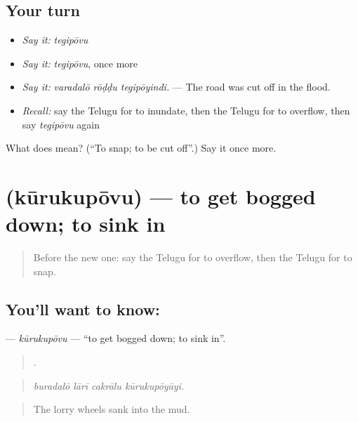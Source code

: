 \subsection*{Your turn}
\begin{itemize}
\raggedright
  \item \emph{Say it:} \emph{tegipōvu}
  \item \emph{Say it:} \emph{tegipōvu}, once more
  \item \emph{Say it:} \emph{varadalō rōḍḍu tegipōyindi.} — The road was cut off in the flood.
  \item \emph{Recall:} say the Telugu for to inundate, then the Telugu for to overflow, then say \emph{tegipōvu} again
\end{itemize}

\begin{tcolorbox}[breakable,colback=teal!4,colframe=teal!35!black,title={Before you move on}]
What does  mean? (\textquotedblleft{}To snap; to be cut off\textquotedblright{}.) Say it once more.
\end{tcolorbox}
\section[\texorpdfstring{\te{కూరుకుపోవు} (kūrukupōvu)}{కూరుకుపోవు (kūrukupōvu)}]{ (kūrukupōvu) — to get bogged down; to sink in}

\label{lesson:TE-C480-kurukupovu}



\begin{quote}
Before the new one: say the Telugu for to overflow, then the Telugu for to snap.
\end{quote}

\subsection*{You'll want to know: }
\textbf{} — \emph{kūrukupōvu} — \textquotedblleft{}to get bogged down; to sink in\textquotedblright{}.

\begin{quote}
   .
\end{quote}

\begin{quote}
\emph{buradalō lārī cakrālu kūrukupōyāyi.}
\end{quote}

\begin{quote}
The lorry wheels sank into the mud.
\end{quote}

